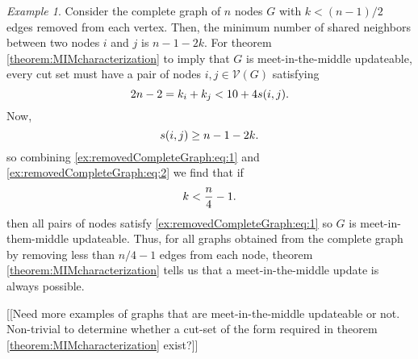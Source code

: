 \documentclass{article}
\theoremstyle{remark}
\newtheorem{example}{Example}
\begin{document}
\begin{example}{\label{ex:removedCompleteGraph}}
	Consider the complete graph of $n$ nodes $G$ with $k<(n-1)/2$ edges removed from each vertex.  Then, the minimum number of shared neighbors between two nodes $i$ and $j$ is $n-1-2k$. For theorem \ref{theorem:MIMcharacterization} to imply that $G$ is meet-in-the-middle updateable, every cut set must have a pair of nodes $i,j\in\mathcal{V}(G)$ satisfying
	\begin{equation}{\label{ex:removedCompleteGraph:eq:1}}
		2n-2 = k_i+k_j < 10 + 4s(i,j).
	\end{equation} 
	Now,
	\begin{equation}{\label{ex:removedCompleteGraph:eq:2}}
		s(i,j) \geq n-1-2k.
	\end{equation}
	so combining \eqref{ex:removedCompleteGraph:eq:1} and \eqref{ex:removedCompleteGraph:eq:2} we find that if
	\begin{equation}{\label{ex:removedCompleteGraph:eq:3}}
		k < \frac{n}{4}-1.
	\end{equation}
	then all pairs of nodes satisfy \eqref{ex:removedCompleteGraph:eq:1} so $G$ is meet-in-them-middle updateable. Thus, for all graphs obtained from the complete graph by removing less than $n/4-1$ edges from each node, theorem \ref{theorem:MIMcharacterization} tells us that a meet-in-the-middle update is always possible.
	
\end{example}

[[Need more examples of graphs that are meet-in-the-middle updateable or not.  Non-trivial to determine whether a cut-set of the form required in theorem \ref{theorem:MIMcharacterization} exist?]]
\end{document}
